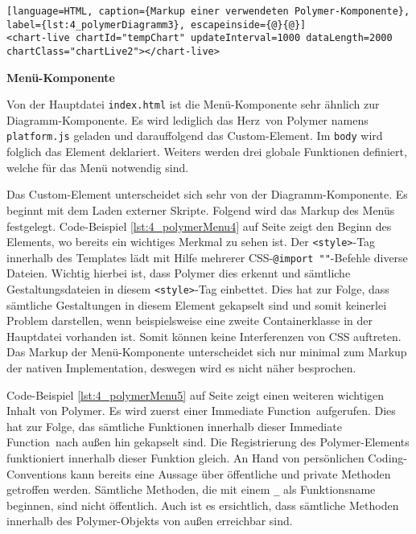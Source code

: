 \begin{lstlisting}[language=HTML, caption={Markup einer verwendeten Polymer-Komponente}, label={lst:4_polymerDiagramm3}, escapeinside={@}{@}]
<chart-live chartId="tempChart" updateInterval=1000 dataLength=2000 chartClass="chartLive2"></chart-live>
\end{lstlisting}





\textbf{Menü-Komponente}

Von der Hauptdatei \lstinline|index.html| ist die Menü-Komponente sehr ähnlich zur Diagramm-Komponente. Es wird lediglich das \glqq Herz\grqq\ von Polymer namens \lstinline|platform.js| geladen und darauffolgend das Custom-Element. Im \lstinline|body| wird folglich das Element deklariert. Weiters werden drei globale Funktionen definiert, welche für das Menü notwendig sind.

Das Custom-Element unterscheidet sich sehr von der Diagramm-Komponente. Es beginnt mit dem Laden externer Skripte. Folgend wird das Markup des Menüs festgelegt. Code-Beispiel \ref{lst:4_polymerMenu4} auf Seite \pageref{lst:4_polymerMenu4} zeigt den Beginn des Elements, wo bereits ein wichtiges Merkmal zu sehen ist. Der \lstinline|<style>|-Tag innerhalb des Templates lädt mit Hilfe mehrerer CSS-\lstinline|@import ""|-Befehle diverse Dateien. Wichtig hierbei ist, dass Polymer dies erkennt und sämtliche Gestaltungsdateien in diesem \lstinline|<style>|-Tag einbettet. Dies hat zur Folge, dass sämtliche Gestaltungen in diesem Element gekapselt sind und somit keinerlei Problem darstellen, wenn beispielsweise eine zweite Containerklasse in der Hauptdatei vorhanden ist. Somit können keine Interferenzen von CSS auftreten. Das Markup der Menü-Komponente unterscheidet sich nur minimal zum Markup der nativen Implementation, deswegen wird es nicht näher besprochen.

Code-Beispiel \ref{lst:4_polymerMenu5} auf Seite \pageref{lst:4_polymerMenu5} zeigt einen weiteren wichtigen Inhalt von Polymer. Es wird zuerst einer \glqq Immediate Function\grqq\ aufgerufen. Dies hat zur Folge, das sämtliche Funktionen innerhalb dieser \glqq Immediate Function\grqq\ nach außen hin gekapselt sind. Die Registrierung des Polymer-Elements funktioniert innerhalb dieser Funktion gleich. An Hand von persönlichen Coding-Conventions kann bereits eine Aussage über öffentliche und private Methoden getroffen werden. Sämtliche Methoden, die mit einem \lstinline|_| als Funktionsname beginnen, sind nicht öffentlich. Auch ist es ersichtlich, dass sämtliche Methoden innerhalb des Polymer-Objekts von außen erreichbar sind.





